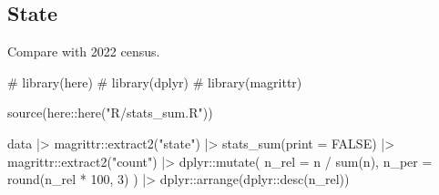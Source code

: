 \documentclass[
  12pt,
  a4paper,
  oneside]{tesesusp}
\newenvironment{Shaded}{\begin{snugshade}}{\end{snugshade}}
\newcommand{\AttributeTok}[1]{\textcolor[rgb]{0.40,0.45,0.13}{#1}}
\newcommand{\CommentTok}[1]{\textcolor[rgb]{0.37,0.37,0.37}{#1}}
\newcommand{\ConstantTok}[1]{\textcolor[rgb]{0.56,0.35,0.01}{#1}}
\newcommand{\DecValTok}[1]{\textcolor[rgb]{0.68,0.00,0.00}{#1}}
\newcommand{\FunctionTok}[1]{\textcolor[rgb]{0.28,0.35,0.67}{#1}}
\newcommand{\NormalTok}[1]{\textcolor[rgb]{0.00,0.23,0.31}{#1}}
\newcommand{\SpecialCharTok}[1]{\textcolor[rgb]{0.37,0.37,0.37}{#1}}
\newcommand{\StringTok}[1]{\textcolor[rgb]{0.13,0.47,0.30}{#1}}
\begin{document}
\hypertarget{state}{%
\subsection{State}\label{state}}

\begin{tcolorbox}[enhanced jigsaw, breakable, colback=white, colbacktitle=quarto-callout-note-color!10!white, leftrule=.75mm, left=2mm, toprule=.15mm, opacityback=0, rightrule=.15mm, title=\textcolor{quarto-callout-note-color}{\faInfo}\hspace{0.5em}{TODO}, opacitybacktitle=0.6, bottomtitle=1mm, titlerule=0mm, toptitle=1mm, coltitle=black, colframe=quarto-callout-note-color-frame, bottomrule=.15mm, arc=.35mm]

Compare with 2022 census.

\end{tcolorbox}

\begin{Shaded}
\begin{Highlighting}[numbers=left,,]
\CommentTok{\# library(here)}
\CommentTok{\# library(dplyr)}
\CommentTok{\# library(magrittr)}

\FunctionTok{source}\NormalTok{(here}\SpecialCharTok{::}\FunctionTok{here}\NormalTok{(}\StringTok{"R/stats\_sum.R"}\NormalTok{))}

\NormalTok{data }\SpecialCharTok{|\textgreater{}} 
\NormalTok{  magrittr}\SpecialCharTok{::}\FunctionTok{extract2}\NormalTok{(}\StringTok{"state"}\NormalTok{) }\SpecialCharTok{|\textgreater{}}
  \FunctionTok{stats\_sum}\NormalTok{(}\AttributeTok{print =} \ConstantTok{FALSE}\NormalTok{) }\SpecialCharTok{|\textgreater{}}
\NormalTok{  magrittr}\SpecialCharTok{::}\FunctionTok{extract2}\NormalTok{(}\StringTok{"count"}\NormalTok{) }\SpecialCharTok{|\textgreater{}}
\NormalTok{  dplyr}\SpecialCharTok{::}\FunctionTok{mutate}\NormalTok{(}
    \AttributeTok{n\_rel =}\NormalTok{ n }\SpecialCharTok{/} \FunctionTok{sum}\NormalTok{(n),}
    \AttributeTok{n\_per =} \FunctionTok{round}\NormalTok{(n\_rel }\SpecialCharTok{*} \DecValTok{100}\NormalTok{, }\DecValTok{3}\NormalTok{)}
\NormalTok{    ) }\SpecialCharTok{|\textgreater{}}
\NormalTok{  dplyr}\SpecialCharTok{::}\FunctionTok{arrange}\NormalTok{(dplyr}\SpecialCharTok{::}\FunctionTok{desc}\NormalTok{(n\_rel))}
\end{Highlighting}
\end{Shaded}
\end{document}
